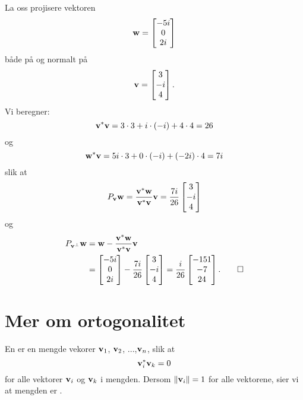 \begin{ex}
La oss projisere vektoren 
\[
\mathbf{w}=
\begin{bmatrix}
 -5i  \\
 0  \\
2i 
\end{bmatrix}
\]
både på og normalt på
\[
\mathbf{v}=
\begin{bmatrix}
 3 \\
 -i \\
 4
\end{bmatrix}.
\]
Vi beregner:
\[
\mathbf{v}^* \mathbf{v}=3\cdot 3+i\cdot (-i)+4\cdot 4=26
\]
og
\[
\mathbf{w}^* \mathbf{v}=5i\cdot 3+0\cdot (-i)+(-2i)\cdot 4=7i
\]
slik at
\begin{align*}
P_{\mathbf{v}}\mathbf{w} =\frac{ \mathbf{v}^*\mathbf{w}}{\mathbf{v}^* \mathbf{v}} \mathbf{v} =
\frac{7i}{26}
\begin{bmatrix}
 3 \\
 -i \\
 4
\end{bmatrix}
\end{align*}
og 
\begin{align*}
P_{\mathbf{v}^{\perp}}\mathbf{w} &=\mathbf{w}-\frac{ \mathbf{v}^*\mathbf{w}}{\mathbf{v}^* \mathbf{v}} \mathbf{v} \\&= 
\begin{bmatrix}
 -5i  \\
 0  \\
2i 
\end{bmatrix}
-
\frac{7i}{26}
\begin{bmatrix}
 3 \\
 -i \\
 4
\end{bmatrix}
=
\frac{i}{26}
\begin{bmatrix}
 -151 \\
 -7 \\
 24
\end{bmatrix}.\qedhere
\end{align*} 
\end{ex}


\section*{Mer om ortogonalitet}
\begin{defnx}
En  er en mengde vekorer $\mathbf{v}_1$, $\mathbf{v}_2$, ...,$\mathbf{v}_n$, slik at
\[
\mathbf{v}_i^*  \mathbf{v}_k = 0
\]
for alle vektorer $\mathbf{v}_i$ og $\mathbf{v}_k$ i mengden. Dersom $\|\mathbf{v}_i \|=1$ for alle vektorene, sier vi at mengden er .
\end{defnx}


